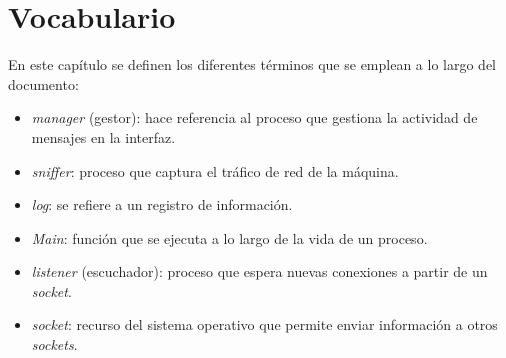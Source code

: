 \chapter{Vocabulario}
\label{ch:vocabulario}

En este capítulo se definen los diferentes términos que se emplean a lo largo del documento:

\begin{itemize}
\item \textit{manager} (gestor): hace referencia al proceso que gestiona la actividad de mensajes en la interfaz.

\item \textit{sniffer}: proceso que captura el tráfico de red de la máquina.

\item \textit{log}: se refiere a un registro de información.

\item \textit{Main}: función que se ejecuta a lo largo de la vida de un proceso.

\item \textit{listener} (escuchador): proceso que espera nuevas conexiones a partir de un \textit{socket}.

\item \textit{socket}: recurso del sistema operativo que permite enviar información a otros \textit{sockets}.


\end{itemize}

